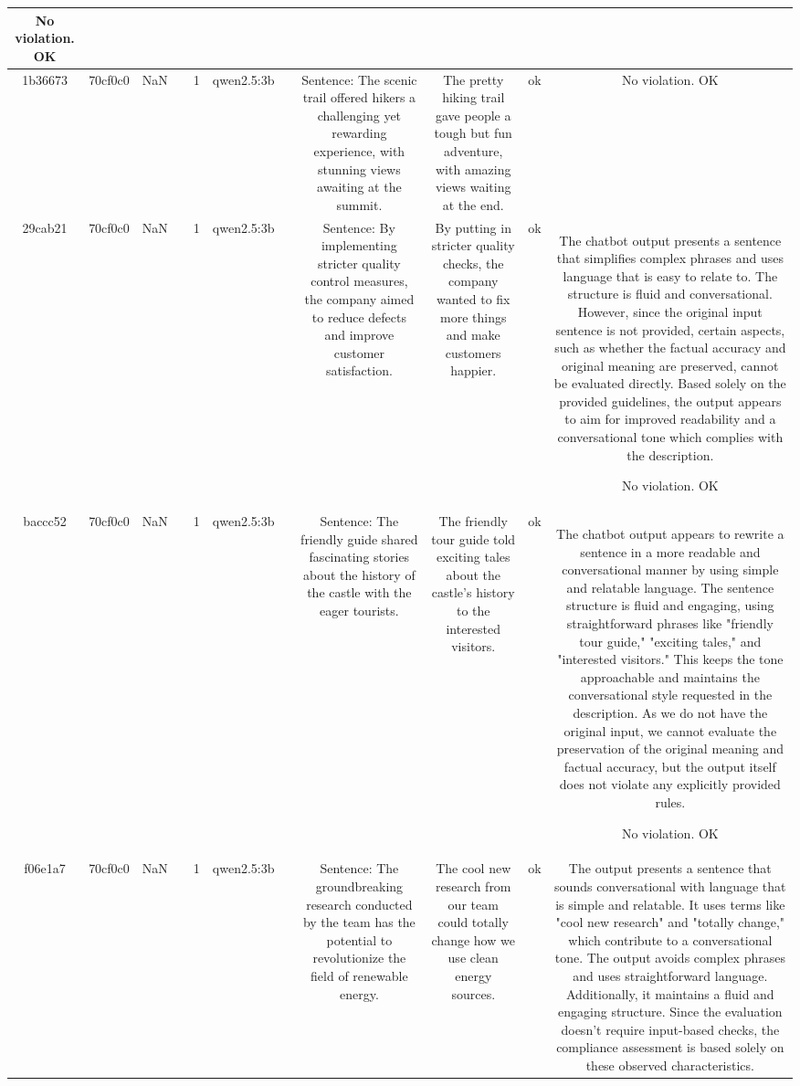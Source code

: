 \begin{table}[h!]
\begin{tabular}{|c|c|c|c|c|c|c|c|c|c|c|}
No violation.
OK\\
\hline
1b36673 & 70cf0c0 & NaN &  & 1 & qwen2.5:3b &  & Sentence: The scenic trail offered hikers a challenging yet rewarding experience, with stunning views awaiting at the summit. & The pretty hiking trail gave people a tough but fun adventure, with amazing views waiting at the end. & ok & No violation.
OK\\
\hline
29cab21 & 70cf0c0 & NaN &  & 1 & qwen2.5:3b &  & Sentence: By implementing stricter quality control measures, the company aimed to reduce defects and improve customer satisfaction. & By putting in stricter quality checks, the company wanted to fix more things and make customers happier. & ok & The chatbot output presents a sentence that simplifies complex phrases and uses language that is easy to relate to. The structure is fluid and conversational. However, since the original input sentence is not provided, certain aspects, such as whether the factual accuracy and original meaning are preserved, cannot be evaluated directly. Based solely on the provided guidelines, the output appears to aim for improved readability and a conversational tone which complies with the description.

No violation.
OK\\
\hline
baccc52 & 70cf0c0 & NaN &  & 1 & qwen2.5:3b &  & Sentence: The friendly guide shared fascinating stories about the history of the castle with the eager tourists. & The friendly tour guide told exciting tales about the castle's history to the interested visitors. & ok & The chatbot output appears to rewrite a sentence in a more readable and conversational manner by using simple and relatable language. The sentence structure is fluid and engaging, using straightforward phrases like "friendly tour guide," "exciting tales," and "interested visitors." This keeps the tone approachable and maintains the conversational style requested in the description. As we do not have the original input, we cannot evaluate the preservation of the original meaning and factual accuracy, but the output itself does not violate any explicitly provided rules.

No violation.
OK\\
\hline
f06e1a7 & 70cf0c0 & NaN &  & 1 & qwen2.5:3b &  & Sentence: The groundbreaking research conducted by the team has the potential to revolutionize the field of renewable energy. & The cool new research from our team could totally change how we use clean energy sources. & ok & The output presents a sentence that sounds conversational with language that is simple and relatable. It uses terms like "cool new research" and "totally change," which contribute to a conversational tone. The output avoids complex phrases and uses straightforward language. Additionally, it maintains a fluid and engaging structure. Since the evaluation doesn't require input-based checks, the compliance assessment is based solely on these observed characteristics. 


\end{tabular}
\end{table}
